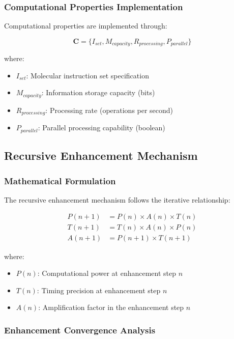\documentclass[12pt,a4paper]{article}
\begin{document}
\subsubsection{Computational Properties Implementation}

Computational properties are implemented through:

\begin{equation}
\boldsymbol{C} = \{I_{set}, M_{capacity}, R_{processing}, P_{parallel}\}
\end{equation}

where:
\begin{itemize}
\item $I_{set}$: Molecular instruction set specification
\item $M_{capacity}$: Information storage capacity (bits)
\item $R_{processing}$: Processing rate (operations per second)
\item $P_{parallel}$: Parallel processing capability (boolean)
\end{itemize}

\subsection{Recursive Enhancement Mechanism}

\subsubsection{Mathematical Formulation}

The recursive enhancement mechanism follows the iterative relationship:

\begin{align}
P(n+1) &= P(n) \times A(n) \times T(n) \\
T(n+1) &= T(n) \times A(n) \times P(n) \\
A(n+1) &= P(n+1) \times T(n+1)
\end{align}

where:
\begin{itemize}
\item $P(n)$: Computational power at enhancement step $n$
\item $T(n)$: Timing precision at enhancement step $n$
\item $A(n)$: Amplification factor in the enhancement step $n$
\end{itemize}

\subsubsection{Enhancement Convergence Analysis}
\end{document}
